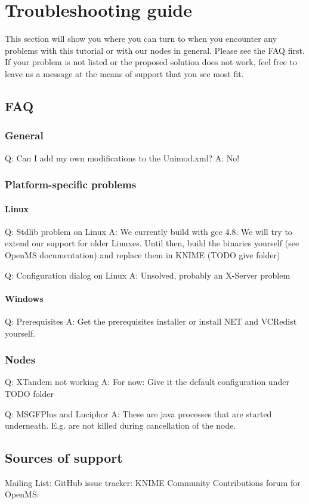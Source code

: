 \section{Troubleshooting guide}
This section will show you where you can turn to when you encounter any problems with this tutorial or with our
nodes in general. Please see the FAQ first. If your problem is not listed or the proposed solution does not work,
feel free to leave us a message at the means of support that you see most fit.

\subsection{FAQ}

\subsubsection{General}
Q: Can I add my own modifications to the Unimod.xml?
A: No!

\subsubsection{Platform-specific problems}
\paragraph{Linux}
Q: Stdlib problem on Linux
A: We currently build with gcc 4.8. We will try to extend our support for older Linuxes. Until then, build the
binaries yourself (see OpenMS documentation) and replace them in KNIME (TODO give folder)

Q: Configuration dialog on Linux
A: Unsolved, probably an X-Server problem

\paragraph{Windows}
Q: Prerequisites
A: Get the prerequisites installer or install NET and VCRedist yourself.

\subsubsection{Nodes}
Q: XTandem not working
A: For now: Give it the default configuration under TODO folder

Q: MSGFPlus and Luciphor
A: These are java processes that are started underneath. E.g. are not killed during cancellation of the node.

\subsection{Sources of support}
Mailing List:
GitHub issue tracker:
KNIME Community Contributions forum for OpenMS: